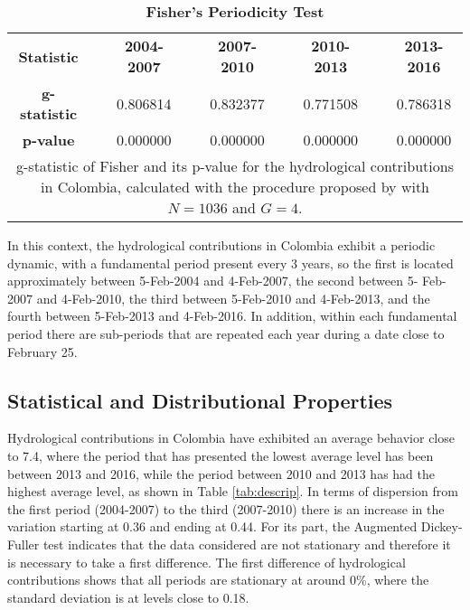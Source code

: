 \documentclass[12pt,halfline,a4paper]{ouparticle}
\begin{document}
\begin{table}[htbp]
	\centering
	\caption{\textbf{Fisher's Periodicity Test}}
	\begin{tabular}{ccccccccc}
		\toprule
		\toprule
		\textbf{Statistic} &       & \textbf{2004-2007 } &       & \textbf{2007-2010 } &       & \textbf{2010-2013 } &       & \textbf{2013-2016 } \\
		\cmidrule{1-1}\cmidrule{3-3}\cmidrule{5-5}\cmidrule{7-7}\cmidrule{9-9}   
		\textbf{g-statistic} &       & 0.806814 &       & 0.832377 &       & 0.771508 &       & 0.786318 \\
		\textbf{p-value} &       & 0.000000 &       & 0.000000 &       & 0.000000 &       & 0.000000 \\
		\bottomrule
		\bottomrule
		\multicolumn{9}{p{14.5cm}}{\footnotesize{g-statistic of Fisher and its p-value for the hydrological contributions in Colombia, calculated with the procedure proposed by \cite{Wichert2004} with $N=1036$ and $G=4$.}}
	\end{tabular}
	\label{tab:g-estadistico}
\end{table}

In this context, the hydrological contributions in Colombia exhibit a periodic dynamic, with a fundamental period present every 3 years, so the first is located approximately between 5-Feb-2004 and 4-Feb-2007, the second between 5- Feb-2007 and 4-Feb-2010, the third between 5-Feb-2010 and 4-Feb-2013, and the fourth between 5-Feb-2013 and 4-Feb-2016. In addition, within each fundamental period there are sub-periods that are repeated each year during a date close to February 25.

\subsection{Statistical and Distributional Properties}

Hydrological contributions in Colombia have exhibited an average behavior close to 7.4, where the period that has presented the lowest average level has been between 2013 and 2016, while the period between 2010 and 2013 has had the highest average level, as shown in Table \ref{tab:descrip}. In terms of dispersion from the first period (2004-2007) to the third (2007-2010) there is an increase in the variation starting at 0.36 and ending at 0.44. For its part, the Augmented Dickey-Fuller test indicates that the data considered are not stationary and therefore it is necessary to take a first difference. The first difference of hydrological contributions shows that all periods are stationary at around 0\%, where the standard deviation is at levels close to 0.18. 
\end{document}
